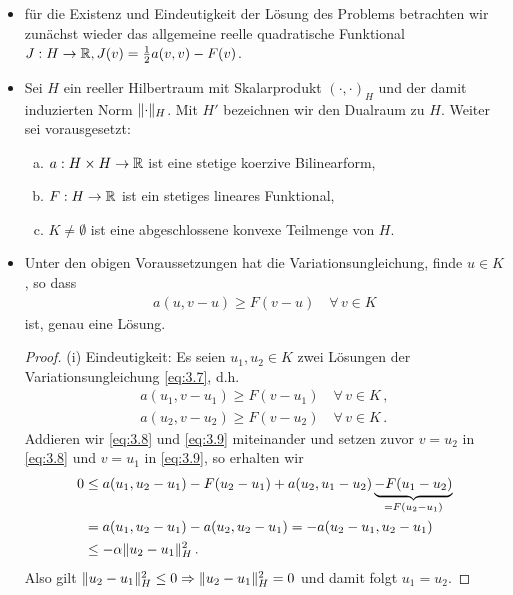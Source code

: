 \begin{itemize}
\item für die Existenz und Eindeutigkeit der Lösung des Problems betrachten wir zunächst wieder das allgemeine reelle quadratische Funktional $J: H \rightarrow \mathbb{R}, J(v) = \frac 1 2 a(v,v) - F(v)$.

\item \begin{vor}
Sei $H$ ein reeller Hilbertraum mit Skalarprodukt $(\cdot,\cdot)_H$ und der damit induzierten Norm $\lVert \cdot\rVert_H$. Mit $H'$ bezeichnen wir den Dualraum zu $H$. Weiter sei vorausgesetzt:
\begin{enumerate}[(a)]
\item $a: H\times H \rightarrow \mathbb{R}$ ist eine stetige koerzive Bilinearform,
\item $F:H\rightarrow\mathbb{R}$ ist ein stetiges lineares Funktional,
\item $K\not = \emptyset$ ist eine abgeschlossene konvexe Teilmenge von $H$.
\end{enumerate}
\end{vor}

\item \begin{theorem}\label{theorem:3.5}
Unter den obigen Voraussetzungen hat die Variationsungleichung, finde $u\in K$, so dass
\begin{align}\label{eq:3.7}
	a(u,v-u) \ge F(v-u) \quad \forall \, v \in K
\end{align}
ist, genau eine Lösung.
\end{theorem}

\begin{proof}
(i) Eindeutigkeit: Es seien $u_1,u_2 \in K$ zwei Lösungen der Variationsungleichung \eqref{eq:3.7}, d.h.
\begin{align}\label{eq:3.8}
	a(u_1,v-u_1) \ge F(v-u_1) \quad \forall \, v \in K\, , \\
	a(u_2,v-u_2) \ge F(v-u_2) \quad \forall \, v \in K\, . \label{eq:3.9}
\end{align}
Addieren wir \eqref{eq:3.8} und \eqref{eq:3.9} miteinander und setzen zuvor $v = u_2$ in \eqref{eq:3.8} und $v = u_1$ in \eqref{eq:3.9}, so erhalten wir
\begin{align*}
	0 & \le a(u_1,u_2-u_1) - F(u_2-u_1) + a(u_2,u_1-u_2) \underbrace{- F(u_1-u_2)}_{=F(u_2-u_1)}  \\
	& = a(u_1,u_2-u_1)-a(u_2,u_2-u_1) = -a(u_2-u_1,u_2-u_1) \\
	& \le -\alpha \lVert u_2-u_1\rVert_H^2 \, .
\end{align*}
Also gilt $\lVert u_2-u_1\rVert_H^2 \le 0 \Rightarrow \lVert u_2-u_1\rVert_H^2 = 0$ und damit folgt $u_1 = u_2$.


\end{proof}
\end{itemize}
